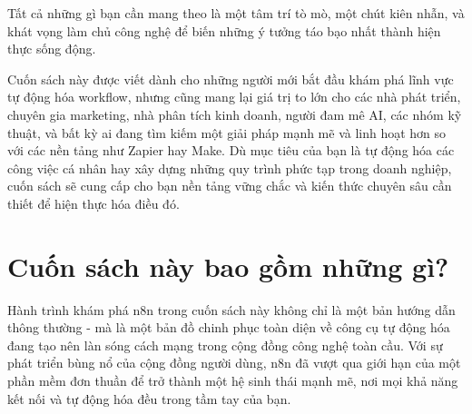 \documentclass[a4paper,12pt]{book}
\begin{document}
Tất cả những gì bạn cần mang theo là một tâm trí tò mò, một chút kiên nhẫn, và khát vọng làm chủ công nghệ để biến những ý tưởng táo bạo nhất thành hiện thực sống động.

Cuốn sách này được viết dành cho những người mới bắt đầu khám phá lĩnh vực tự động hóa workflow, nhưng cũng mang lại giá trị to lớn cho các nhà phát triển, chuyên gia marketing, nhà phân tích kinh doanh, người đam mê AI, các nhóm kỹ thuật, và bất kỳ ai đang tìm kiếm một giải pháp mạnh mẽ và linh hoạt hơn so với các nền tảng như Zapier hay Make. Dù mục tiêu của bạn là tự động hóa các công việc cá nhân hay xây dựng những quy trình phức tạp trong doanh nghiệp, cuốn sách sẽ cung cấp cho bạn nền tảng vững chắc và kiến thức chuyên sâu cần thiết để hiện thực hóa điều đó.

\newpage
\section*{Cuốn sách này bao gồm những gì?}
\begin{center}
    
\end{center}

Hành trình khám phá n8n trong cuốn sách này không chỉ là một bản hướng dẫn thông thường - mà là một bản đồ chinh phục toàn diện về công cụ tự động hóa đang tạo nên làn sóng cách mạng trong cộng đồng công nghệ toàn cầu. Với sự phát triển bùng nổ của cộng đồng người dùng, n8n đã vượt qua giới hạn của một phần mềm đơn thuần để trở thành một hệ sinh thái mạnh mẽ, nơi mọi khả năng kết nối và tự động hóa đều trong tầm tay của bạn.
\end{document}
